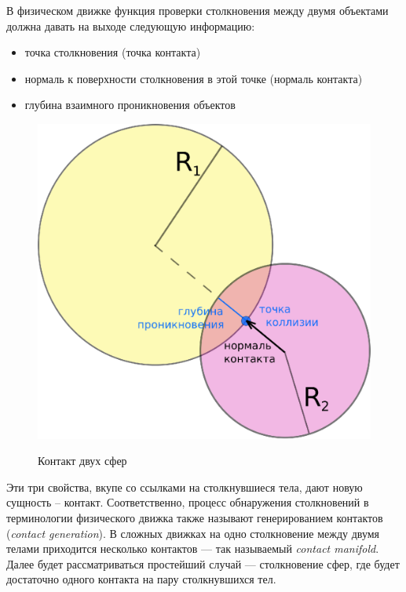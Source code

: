 В физическом движке функция проверки столкновения между двумя объектами должна давать на выходе следующую
информацию:
\begin{itemize}
  \item точка столкновения (точка контакта)
  \item нормаль к поверхности столкновения в этой точке (нормаль контакта)
  \item глубина взаимного проникновения объектов
\end{itemize}
\begin{figure}[ht!]
\begin{center}
\includegraphics[scale=0.45]{./Geometry/SphereCollision.eps}  \\
\caption{Контакт двух сфер}\label{SphereCollision}
\end{center}
\end{figure}
Эти три свойства, вкупе со ссылками на столкнувшиеся тела, дают новую сущность – контакт. Соответственно,
процесс обнаружения столкновений в терминологии физического движка также называют генерированием
контактов (\textit{contact generation}). В сложных движках на одно столкновение между двумя телами приходится несколько
контактов --- так называемый \textit{contact manifold}. Далее будет рассматриваться простейший случай --- столкновение сфер, где будет
достаточно одного контакта на пару столкнувшихся тел.


